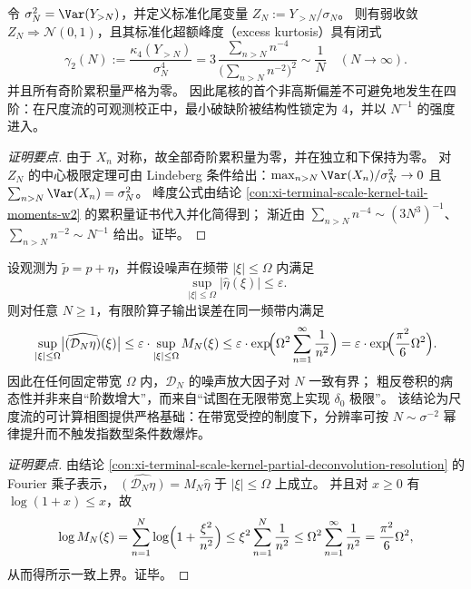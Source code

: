 \begin{conclusion}[尾核的高斯化与四阶首破缺：非高斯性由 \texorpdfstring{$q=4$}{q=4} 量级唯一主导]\label{con:xi-terminal-scale-kernel-tail-gaussianization-kurtosis}
令 \(\sigma_N^2=\Var(Y_{>N})\)，并定义标准化尾变量 \(Z_N:=Y_{>N}/\sigma_N\)。
则有弱收敛 \(Z_N\Rightarrow \mathcal N(0,1)\)，且其标准化超额峰度（excess kurtosis）具有闭式
\[
\boxed{\;
\gamma_2(N):=\frac{\kappa_4(Y_{>N})}{\sigma_N^4}
=3\,\frac{\sum_{n>N}n^{-4}}{\bigl(\sum_{n>N}n^{-2}\bigr)^2}
\sim \frac{1}{N}\quad(N\to\infty).\;}
\]
并且所有奇阶累积量严格为零。
因此尾核的首个非高斯偏差不可避免地发生在四阶：在尺度流的可观测校正中，最小破缺阶被结构性锁定为 \(4\)，并以 \(N^{-1}\) 的强度进入。
\end{conclusion}
\begin{proof}[证明要点]
由于 \(X_n\) 对称，故全部奇阶累积量为零，并在独立和下保持为零。
对 \(Z_N\) 的中心极限定理可由 Lindeberg 条件给出：\(\max_{n>N}\Var(X_n)/\sigma_N^2\to 0\) 且 \(\sum_{n>N}\Var(X_n)=\sigma_N^2\)。
峰度公式由结论 \ref{con:xi-terminal-scale-kernel-tail-moments-w2} 的累积量证书代入并化简得到；
渐近由 \(\sum_{n>N}n^{-4}\sim (3N^3)^{-1}\)、\(\sum_{n>N}n^{-2}\sim N^{-1}\) 给出。证毕。
\end{proof}

\begin{conclusion}\label{con:xi-terminal-scale-kernel-bandwidth-conditioned}
设观测为 \(\widetilde p=p+\eta\)，并假设噪声在频带 \(|\xi|\le\Omega\) 内满足
\[
\sup_{|\xi|\le\Omega}|\widehat\eta(\xi)|\le\varepsilon.
\]
则对任意 \(N\ge 1\)，有限阶算子输出误差在同一频带内满足
\[
\sup_{|\xi|\le\Omega}\bigl|\widehat{(\mathcal D_N\eta)}(\xi)\bigr|
\le
\varepsilon\cdot \sup_{|\xi|\le\Omega}M_N(\xi)
\le
\varepsilon\cdot \exp\!\Bigl(\Omega^2\sum_{n=1}^{\infty}\frac{1}{n^2}\Bigr)
=\varepsilon\cdot \exp\!\Bigl(\frac{\pi^2}{6}\Omega^2\Bigr).
\]
因此在任何固定带宽 \(\Omega\) 内，\(\mathcal D_N\) 的噪声放大因子对 \(N\) 一致有界；
粗反卷积的病态性并非来自“阶数增大”，而来自“试图在无限带宽上实现 \(\delta_0\) 极限”。
该结论为尺度流的可计算相图提供严格基础：在带宽受控的制度下，分辨率可按 \(N\sim\sigma^{-2}\) 幂律提升而不触发指数型条件数爆炸。
\end{conclusion}
\begin{proof}[证明要点]
由结论 \ref{con:xi-terminal-scale-kernel-partial-deconvolution-resolution} 的 Fourier 乘子表示，
\(
\widehat{(\mathcal D_N\eta)}=M_N\widehat\eta
\)
于 \(|\xi|\le\Omega\) 上成立。
并且对 \(x\ge 0\) 有 \(\log(1+x)\le x\)，故
\[
\log M_N(\xi)=\sum_{n=1}^{N}\log\Bigl(1+\frac{\xi^2}{n^2}\Bigr)\le \xi^2\sum_{n=1}^{N}\frac{1}{n^2}
\le \Omega^2\sum_{n=1}^{\infty}\frac{1}{n^2}=\frac{\pi^2}{6}\Omega^2,
\]
从而得所示一致上界。证毕。
\end{proof}


